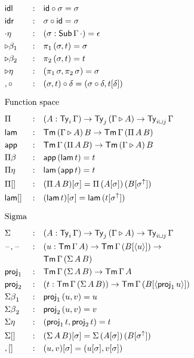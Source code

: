 \documentclass{article}
\begin{document}
\begin{multicols}{3}
\begin{alignat*}{5}
  & \idl && : && \id\circ\sigma = \sigma \\
  & \idr && : && \sigma\circ\id = \sigma \\
  & {\cdot\eta} && : && (\sigma : \Tms\,\Gamma\,\cdot) = \epsilon \\
  & {\ext\beta_1} && : && \pi_1\,(\sigma, t) = \sigma \\
  & {\ext\beta_2} && : && \pi_2\,(\sigma, t) = t \\
  & {\ext\eta} && : && (\pi_1\,\sigma, \pi_2\,\sigma) = \sigma \\
  & {,\circ} && : && (\sigma, t)\circ\delta = (\sigma\circ\delta, t[\delta]) \\
  & \heading{Function space} \\
  & \Pi && : && (A:\Ty_i\,\Gamma)\ra\Ty_j\,(\Gamma\ext A)\ra\Ty_{\max{i}{j}}\,\Gamma \\
  & \lam && : && \Tm\,(\Gamma\ext A)\,B\ra\Tm\,\Gamma\,(\Pi\,A\,B) \\
  & \app && : && \Tm\,\Gamma\,(\Pi\,A\,B)\ra\Tm\,(\Gamma\ext A)\,B \\
  & {\Pi\beta} && : && \app\,(\lam\,t) = t \\
  & {\Pi\eta} && : && \lam\,(\app\,t) = t \\
  & {\Pi[]} && : && (\Pi\,A\,B)[\sigma] = \Pi\,(A[\sigma])\,(B[\sigma^\uparrow]) \\
  & {\lam[]} && : && (\lam\,t)[\sigma] = \lam\,(t[\sigma^\uparrow]) \\
  & \heading{Sigma} \\
  & \Sigma && : && (A:\Ty_i\,\Gamma)\ra\Ty_j\,(\Gamma\ext A)\ra\Ty_{\max{i}{j}}\,\Gamma \\
  & \blank,\blank && : && (u:\Tm\,\Gamma\,A)\ra\Tm\,\Gamma\,(B[\lb u\rb])\ra \\
  & && && \Tm\,\Gamma\,(\Sigma\,A\,B) \\
  & \proj_1 && : && \Tm\,\Gamma\,(\Sigma\,A\,B)\ra\Tm\,\Gamma\,A \\
  & \proj_2 && : && (t:\Tm\,\Gamma\,(\Sigma\,A\,B))\ra\Tm\,\Gamma\,(B[\lb \proj_1\,u\rb]) \\
  & {\Sigma\beta}_1 && : && \proj_1\,(u,v) = u \\
  & {\Sigma\beta}_2 && : && \proj_2\,(u,v) = v \\
  & {\Sigma\eta} && : && (\proj_1\,t, \proj_2\,t) = t \\
  & {\Sigma[]} && : && (\Sigma\,A\,B)[\sigma] = \Sigma\,(A[\sigma])\,(B[\sigma^\uparrow]) \\
  & {,[]} && : && (u,v)[\sigma] = (u[\sigma], v[\sigma]) \\

\end{alignat*}
\end{multicols}
\end{document}
